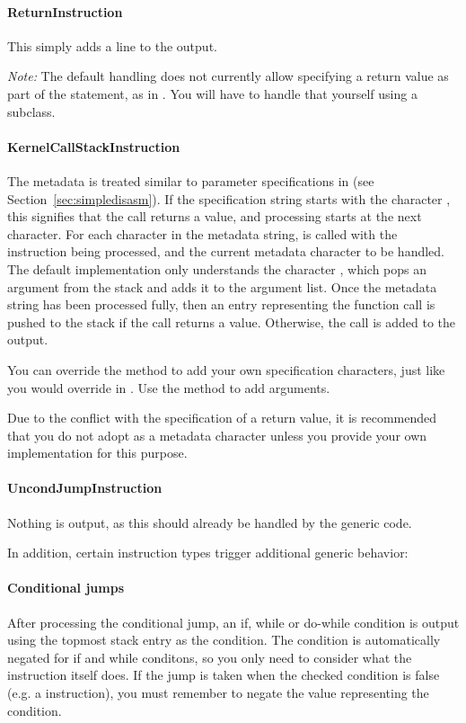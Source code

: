 \paragraph{ReturnInstruction}
This simply adds a line  to the output.

\emph{Note:} The default handling does not currently allow specifying a return value as part of the statement, as in . You will have to handle that yourself using a subclass.

\paragraph{KernelCallStackInstruction}
The metadata is treated similar to parameter specifications in  (see Section~\vref{sec:simpledisasm}). If the specification string starts with the character , this signifies that the call returns a value, and processing starts at the next character.
For each character in the metadata string,  is called with the instruction being processed, and the current metadata character to be handled. The default implementation only understands the character , which pops an argument from the stack and adds it to the argument list.
Once the metadata string has been processed fully, then an entry representing the function call is pushed to the stack if the call returns a value. Otherwise, the call is added to the output.

You can override the  method to add your own specification characters, just like you would override  in . Use the  method to add arguments.

Due to the conflict with the specification of a return value, it is recommended that you do not adopt  as a metadata character unless you provide your own  implementation for this purpose.

\paragraph{UncondJumpInstruction}
Nothing is output, as this should already be handled by the generic code.

In addition, certain instruction types trigger additional generic behavior:
\paragraph{Conditional jumps}
After processing the conditional jump, an if, while or do-while condition is output using the topmost stack entry as the condition. The condition is automatically negated for if and while conditons, so you only need to consider what the instruction itself does. If the jump is taken when the checked condition is false (e.g. a  instruction), you must remember to negate the value representing the condition.

